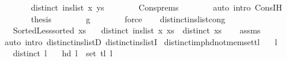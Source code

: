 \begin{isabellebody}
\ \ \ \ \isamarkupfalse%
\ \isamarkupfalse%
\ {\isachardoublequoteopen}distinct\ {\isacharparenleft}{\kern0pt}ins{\isacharunderscore}{\kern0pt}list\ x\ ys{\isacharparenright}{\kern0pt}{\isachardoublequoteclose}\isanewline
\ \ \ \ \ \ \isamarkupfalse%
\ Cons{\isachardot}{\kern0pt}prems\isanewline
\ \ \ \ \ \ \isamarkupfalse%
\ {\isacharparenleft}{\kern0pt}auto\ intro{\isacharcolon}{\kern0pt}\ Cons{\isachardot}{\kern0pt}IH{\isacharparenright}{\kern0pt}\isanewline
\ \ \ \ \isamarkupfalse%
\ \isamarkupfalse%
\ {\isacharquery}{\kern0pt}thesis\isanewline
\ \ \ \ \ \ \isamarkupfalse%
\ g\isanewline
\ \ \ \ \ \ \isamarkupfalse%
\ force\isanewline
\ \ \isamarkupfalse%
\isanewline
{}\isamarkupfalse%
%
\endisatagproof
{\isafoldproof}%
%
\isadelimproof
\isanewline
%
\endisadelimproof
\isanewline
{}\isamarkupfalse%
\ distinct{\isacharunderscore}{\kern0pt}ins{\isacharunderscore}{\kern0pt}list{\isacharunderscore}{\kern0pt}cong{\isacharcolon}{\kern0pt}\isanewline
\ \ \ {\isachardoublequoteopen}Sorted{\isacharunderscore}{\kern0pt}Less{\isachardot}{\kern0pt}sorted\ xs{\isachardoublequoteclose}\isanewline
\ \ \ {\isachardoublequoteopen}distinct\ {\isacharparenleft}{\kern0pt}ins{\isacharunderscore}{\kern0pt}list\ x\ xs{\isacharparenright}{\kern0pt}\ {\isacharequal}{\kern0pt}\ distinct\ xs{\isachardoublequoteclose}\isanewline
%
\isadelimproof
\ \ %
\endisadelimproof
%
\isatagproof
{}\isamarkupfalse%
\ assms\isanewline
\ \ \isamarkupfalse%
\ {\isacharparenleft}{\kern0pt}auto\ intro{\isacharcolon}{\kern0pt}\ distinct{\isacharunderscore}{\kern0pt}ins{\isacharunderscore}{\kern0pt}listD\ distinct{\isacharunderscore}{\kern0pt}ins{\isacharunderscore}{\kern0pt}listI{\isacharparenright}{\kern0pt}%
\endisatagproof
{\isafoldproof}%
%
\isadelimproof
\isanewline
%
\endisadelimproof
\isanewline
{}\isamarkupfalse%
\ distinct{\isacharunderscore}{\kern0pt}imp{\isacharunderscore}{\kern0pt}hd{\isacharunderscore}{\kern0pt}not{\isacharunderscore}{\kern0pt}mem{\isacharunderscore}{\kern0pt}set{\isacharunderscore}{\kern0pt}tl{\isacharcolon}{\kern0pt}\isanewline
\ \ \ {\isachardoublequoteopen}l\ {\isasymnoteq}\ {\isacharbrackleft}{\kern0pt}{\isacharbrackright}{\kern0pt}{\isachardoublequoteclose}\isanewline
\ \ \ {\isachardoublequoteopen}distinct\ l{\isachardoublequoteclose}\isanewline
\ \ \ {\isachardoublequoteopen}hd\ l\ {\isasymnotin}\ set\ {\isacharparenleft}{\kern0pt}tl\ l{\isacharparenright}{\kern0pt}{\isachardoublequoteclose}\isanewline

\end{isabellebody}
